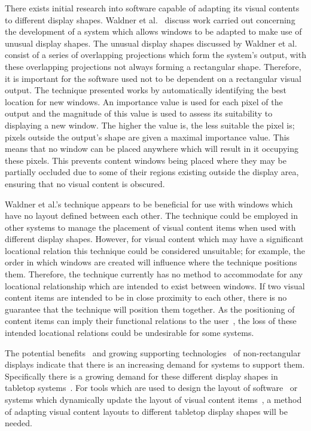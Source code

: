 \documentclass{bmcart}
\begin{document}
There exists initial research into software capable of adapting its visual contents to different display shapes.
Waldner et al.~\cite{Waldner2011} discuss work carried out concerning the development of a system which allows windows to be adapted to make use of unusual display shapes.
The unusual display shapes discussed by Waldner et al. consist of a series of overlapping projections which form the system's output, with these overlapping projections not always forming a rectangular shape.
Therefore, it is important for the software used not to be dependent on a rectangular visual output.
The technique presented works by automatically identifying the best location for new windows.
An importance value is used for each pixel of the output and the magnitude of this value is used to assess its suitability to displaying a new window.
The higher the value is, the less suitable the pixel is; pixels outside the output's shape are given a maximal importance value.
This means that no window can be placed anywhere which will result in it occupying these pixels.
This prevents content windows being placed where they may be partially occluded due to some of their regions existing outside the display area, ensuring that no visual content is obscured.

Waldner et al.'s technique appears to be beneficial for use with windows which have no layout defined between each other.
The technique could be employed in other systems to manage the placement of visual content items when used with different display shapes.
However, for visual content which may have a significant locational relation this technique could be considered unsuitable; for example, the order in which windows are created will influence where the technique positions them.
Therefore, the technique currently has no method to accommodate for any locational relationship which are intended to exist between windows.
If two visual content items are intended to be in close proximity to each other, there is no guarantee that the technique will position them together.
As the positioning of content items can imply their functional relations to the user~\cite{Constantine1999}, the loss of these intended locational relations could be undesirable for some systems.

The potential benefits~\cite{Greenfield2006,Vernier2002} and growing supporting technologies~\cite{Boyd2007,Finney2009} of non-rectangular displays indicate that there is an increasing demand for systems to support them.
Specifically there is a growing demand for these different display shapes in tabletop systems~\cite{Hansen2009,Shen2004}.
For tools which are used to design the layout of software~\cite{Meskens2008} or systems which dynamically update the layout of visual content items~\cite{Gajos2004}, a method of adapting visual content layouts to different tabletop display shapes will be needed.
\end{document}
